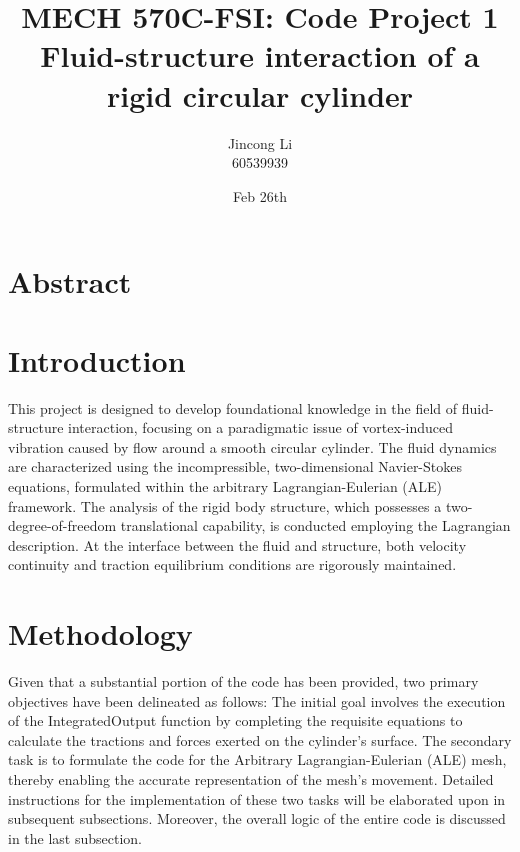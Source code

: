 \documentclass[a4paper,12pt]{article} %
\begin{document}
\setlength{\parskip}{1em} 
\setlength{\parindent}{0pt}
\newcommand{\vect}[1]{\mathbf{#1}}

\title{MECH 570C-FSI: Code Project 1 \\Fluid-structure interaction of a rigid circular cylinder}
\author{Jincong Li \\ 60539939}
\date{Feb 26th}
\maketitle

\section*{Abstract}

\section*{Introduction}
This project is designed to develop foundational knowledge in the field of fluid-structure interaction, 
focusing on a paradigmatic issue of vortex-induced vibration caused by flow around a smooth circular 
cylinder. The fluid dynamics are characterized using the incompressible, two-dimensional Navier-Stokes equations, 
formulated within the arbitrary Lagrangian-Eulerian (ALE) framework. The analysis of the rigid body structure,
which possesses a two-degree-of-freedom translational capability, is conducted employing the Lagrangian 
description. At the interface between the fluid and structure, both velocity continuity and traction 
equilibrium conditions are rigorously maintained.

\section*{Methodology}
Given that a substantial portion of the code has been provided, two primary objectives have been delineated 
as follows: The initial goal involves the execution of the IntegratedOutput function by completing the requisite 
equations to calculate the tractions and forces exerted on the cylinder's surface. The secondary task is to 
formulate the code for the Arbitrary Lagrangian-Eulerian (ALE) mesh, thereby enabling 
the accurate representation of the mesh's movement. Detailed instructions for the implementation of these 
two tasks will be elaborated upon in subsequent subsections. Moreover, the overall logic of the entire code is 
discussed in the last subsection.
\end{document}
